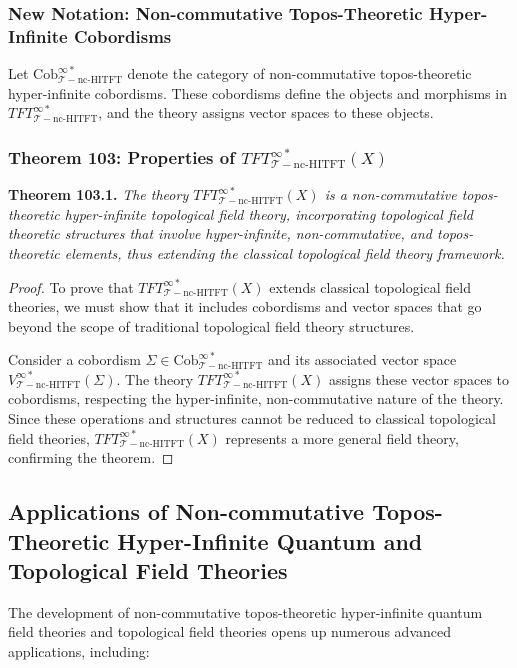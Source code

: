 \documentclass{article}
\begin{document}
\subsubsection{New Notation: Non-commutative Topos-Theoretic Hyper-Infinite Cobordisms}
Let \(\text{Cob}_{\mathcal{T}-\text{nc-HITFT}}^{\infty *}\) denote the category of non-commutative topos-theoretic hyper-infinite cobordisms. These cobordisms define the objects and morphisms in \(TFT_{\mathcal{T}-\text{nc-HITFT}}^{\infty *}\), and the theory assigns vector spaces to these objects.

\subsubsection{Theorem 103: Properties of \(TFT_{\mathcal{T}-\text{nc-HITFT}}^{\infty *}(X)\)}
\textbf{Theorem 103.1.} \textit{The theory \(TFT_{\mathcal{T}-\text{nc-HITFT}}^{\infty *}(X)\) is a non-commutative topos-theoretic hyper-infinite topological field theory, incorporating topological field theoretic structures that involve hyper-infinite, non-commutative, and topos-theoretic elements, thus extending the classical topological field theory framework.}

\begin{proof}
To prove that \(TFT_{\mathcal{T}-\text{nc-HITFT}}^{\infty *}(X)\) extends classical topological field theories, we must show that it includes cobordisms and vector spaces that go beyond the scope of traditional topological field theory structures.

Consider a cobordism \(\Sigma \in \text{Cob}_{\mathcal{T}-\text{nc-HITFT}}^{\infty *}\) and its associated vector space \(V_{\mathcal{T}-\text{nc-HITFT}}^{\infty *}(\Sigma)\). The theory \(TFT_{\mathcal{T}-\text{nc-HITFT}}^{\infty *}(X)\) assigns these vector spaces to cobordisms, respecting the hyper-infinite, non-commutative nature of the theory. Since these operations and structures cannot be reduced to classical topological field theories, \(TFT_{\mathcal{T}-\text{nc-HITFT}}^{\infty *}(X)\) represents a more general field theory, confirming the theorem.
\end{proof}

\subsection{Applications of Non-commutative Topos-Theoretic Hyper-Infinite Quantum and Topological Field Theories}
The development of non-commutative topos-theoretic hyper-infinite quantum field theories and topological field theories opens up numerous advanced applications, including:
\end{document}
